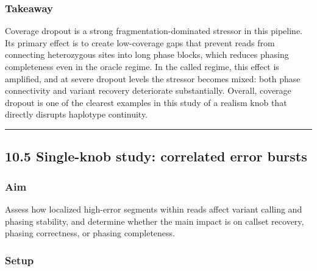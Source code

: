 \documentclass[
]{article}
\begin{document}
\subsubsection{Takeaway}\label{takeaway-2}

Coverage dropout is a strong fragmentation-dominated stressor in this
pipeline. Its primary effect is to create low-coverage gaps that prevent
reads from connecting heterozygous sites into long phase blocks, which
reduces phasing completeness even in the oracle regime. In the called
regime, this effect is amplified, and at severe dropout levels the
stressor becomes mixed: both phase connectivity and variant recovery
deteriorate substantially. Overall, coverage dropout is one of the
clearest examples in this study of a realism knob that directly disrupts
haplotype continuity.

\begin{center}\rule{0.5\linewidth}{0.5pt}\end{center}

\subsection{10.5 Single-knob study: correlated error
bursts}\label{single-knob-study-correlated-error-bursts}

\subsubsection{Aim}\label{aim-3}

Assess how localized high-error segments within reads affect variant
calling and phasing stability, and determine whether the main impact is
on callset recovery, phasing correctness, or phasing completeness.

\subsubsection{Setup}\label{setup-3}
\end{document}
